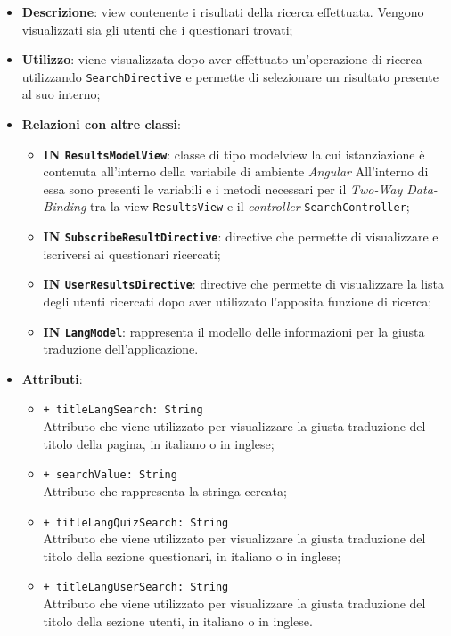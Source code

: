 \begin{itemize}
	\item \textbf{Descrizione}: view contenente i risultati della ricerca effettuata. Vengono visualizzati sia gli utenti che i questionari trovati;
	\item \textbf{Utilizzo}: viene visualizzata dopo aver effettuato un'operazione di ricerca utilizzando \texttt{SearchDirective} e permette di selezionare un risultato presente al suo interno; 
	\item \textbf{Relazioni con altre classi}:
	\begin{itemize}
		\item \textbf{IN \texttt{ResultsModelView}}: classe di tipo modelview la cui istanziazione è contenuta all'interno della variabile di ambiente \textit{Angular} All'interno di essa sono presenti le variabili e i metodi necessari per il \textit{Two-Way Data-Binding} tra la view \texttt{ResultsView} e il \textit{controller} \texttt{SearchController};
		\item \textbf{IN \texttt{SubscribeResultDirective}}: directive che permette di visualizzare e iscriversi ai questionari ricercati;
		\item \textbf{IN \texttt{UserResultsDirective}}: directive che permette di visualizzare la lista degli utenti ricercati dopo aver utilizzato l'apposita funzione di ricerca;
		\item \textbf{IN \texttt{LangModel}}: rappresenta il modello delle informazioni per la giusta traduzione dell'applicazione.
	\end{itemize}
	\item \textbf{Attributi}:
		\begin{itemize}
			\item \texttt{+ titleLangSearch: String} \\ Attributo che viene utilizzato per visualizzare la giusta traduzione del titolo della pagina, in italiano o in inglese;
			\item \texttt{+ searchValue: String} \\ Attributo che rappresenta la stringa cercata;
			\item \texttt{+ titleLangQuizSearch: String} \\ Attributo che viene utilizzato per visualizzare la giusta traduzione del titolo della sezione questionari, in italiano o in inglese;
			\item \texttt{+ titleLangUserSearch: String} \\ Attributo che viene utilizzato per visualizzare la giusta traduzione del titolo della sezione utenti, in italiano o in inglese.
		\end{itemize}
\end{itemize}